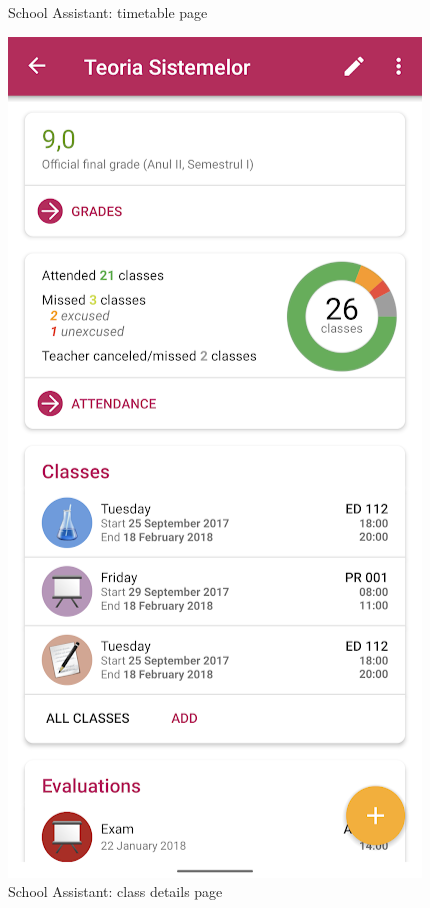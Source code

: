 \begin{figure}[!ht]
\begin{minipage}[b]{0.39\textwidth}
                    \caption{School Assistant: timetable page}
                    \label{2:fig:school_assistant_timetable}
                \end{minipage}
                \hfill
                \begin{minipage}[b]{0.39\textwidth}
                    \captionsetup{justification=centering}
                    \includegraphics[width=\textwidth]{figures/uni_apps/features/school_assistant_class.png}
                    \caption{School Assistant: class details page}
                    \label{2:fig:school_assistant_class}
                \end{minipage}
                
        \end{figure}  
    
